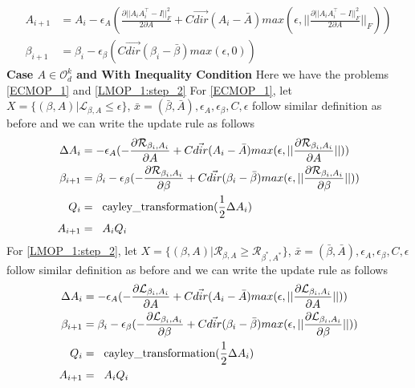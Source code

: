 \begin{equation}
\begin{aligned}
A_{i+1} &= A_{i} - \epsilon_A ( \frac{\partial || A_iA^\top_i -I||^2_F}{2\partial A} + C \vec{dir}(A_i-\bar{A}) max(\epsilon,||\frac{\partial || A_iA^\top_i -I||^2_F}{2\partial A}||_F))\\
\beta_{i+1} &= \beta_{i} - \epsilon_{\beta} ( C \vec{dir}(\beta_i-\bar{\beta}) max(\epsilon,0))
\end{aligned}    
\end{equation}
\newline \textbf{Case $A \in \mathcal{O}_d^k$ and With Inequality Condition}
\newline Here we have the problems \ref{ECMOP_1} and \ref{LMOP_1:step_2} 
\newline For \ref{ECMOP_1}, let $X = \{(\beta, A) |  \mathcal{L}_{\beta, A} \le \epsilon \}$, $\bar{x} = (\bar{\beta},\bar{A}), \epsilon_A, \epsilon_{\beta}, C, \epsilon$ follow similar definition as before and we can write the update rule as follows
\begin{equation}
\begin{aligned}
\Delta A_{i} &= - \epsilon_A ( -\frac{\partial \mathcal{R}_{\beta_i, A_i}}{\partial A} + C \vec{dir}(A_i-\bar{A}) max(\epsilon,||\frac{\partial \mathcal{R}_{\beta_i, A_i}}{\partial A}||))\\
\beta_{i+1} &= \beta_{i} - \epsilon_{\beta} ( -\frac{\partial \mathcal{R}_{\beta_i, A_i}}{\partial \beta} + C \vec{dir}(\beta_i-\bar{\beta}) max(\epsilon,||\frac{\partial \mathcal{R}_{\beta_i, A_i}}{\partial \beta}||))\\
Q_i &= \hspace{2mm} \text{cayley\_transformation}(\frac{1}{2} \Delta A_i)\\
A_{i+1} &= \hspace{2mm} A_i Q_i \\
\end{aligned}    
\end{equation}
\newline For \ref{LMOP_1:step_2}, let $X = \{(\beta, A) | \mathcal{R}_{\beta, A} \ge \mathcal{R}_{\beta^{*}, A^{*}}\}$, $\bar{x} = (\bar{\beta},\bar{A}), \epsilon_A, \epsilon_{\beta}, C, \epsilon$ follow similar definition as before and we can write the update rule as follows
\begin{equation}
\begin{aligned}
\Delta A_{i} &= - \epsilon_A ( -\frac{\partial \mathcal{L}_{\beta_i, A_i}}{\partial A} + C \vec{dir}(A_i-\bar{A}) max(\epsilon,||\frac{\partial \mathcal{L}_{\beta_i, A_i}}{\partial A}||))\\
\beta_{i+1} &= \beta_{i} - \epsilon_{\beta} ( -\frac{\partial \mathcal{L}_{\beta_i, A_i}}{\partial \beta} + C \vec{dir}(\beta_i-\bar{\beta}) max(\epsilon,||\frac{\partial \mathcal{L}_{\beta_i, A_i}}{\partial \beta}||))\\
Q_i &= \hspace{2mm} \text{cayley\_transformation}(\frac{1}{2} \Delta A_i)\\
A_{i+1} &= \hspace{2mm} A_i Q_i \\
\end{aligned}    
\end{equation}
